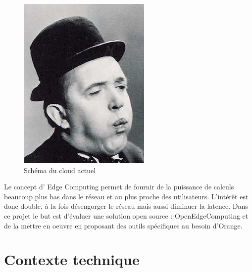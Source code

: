 \documentclass[twocolumn,a4paper]{IEEEtranfr}
\begin{document}
\begin{figure}[htpb]
  \begin{center}
    \includegraphics[width=0.7\columnwidth] {../images/SLaurel.jpg}
  \end{center}
  \caption{Schéma du cloud actuel}
  \label{fig:cloud}
\end{figure}

Le concept d’ Edge Computing permet de fournir de la puissance de calculs beaucoup plus bas dans le réseau et au plus proche des utilisateurs. L'intérêt est donc double, à la fois désengorger le réseau mais aussi diminuer la latence.
Dans ce projet le but est d’évaluer une solution open source : OpenEdgeComputing et de la mettre en oeuvre en proposant des outils spécifiques au besoin d’Orange.

\section{Contexte technique}
\end{document}
